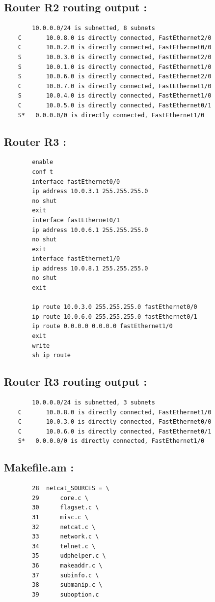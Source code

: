 \documentclass[a4paper,11pt]{article}
\begin{document}
	 	\subsection{Router R2 routing output :}
	 	\label{subsec:routerconfout2}
	 	\begin{lstlisting}
	    10.0.0.0/24 is subnetted, 8 subnets
	C       10.0.8.0 is directly connected, FastEthernet2/0
	C       10.0.2.0 is directly connected, FastEthernet0/0
	S       10.0.3.0 is directly connected, FastEthernet2/0
	S       10.0.1.0 is directly connected, FastEthernet1/0
	S       10.0.6.0 is directly connected, FastEthernet2/0
	C       10.0.7.0 is directly connected, FastEthernet1/0
	S       10.0.4.0 is directly connected, FastEthernet1/0
	C       10.0.5.0 is directly connected, FastEthernet0/1
	S*   0.0.0.0/0 is directly connected, FastEthernet1/0
	 	\end{lstlisting}

	 	\subsection{Router R3 :}
	 	\label{subsec:routerconf3}
	 	\begin{lstlisting}
	 	enable
	 	conf t
	 	interface fastEthernet0/0
	 	ip address 10.0.3.1 255.255.255.0
	 	no shut
	 	exit
	 	interface fastEthernet0/1
	 	ip address 10.0.6.1 255.255.255.0
	 	no shut
	 	exit
	 	interface fastEthernet1/0
	 	ip address 10.0.8.1 255.255.255.0
	 	no shut
	 	exit

	 	ip route 10.0.3.0 255.255.255.0 fastEthernet0/0
	 	ip route 10.0.6.0 255.255.255.0 fastEthernet0/1
	 	ip route 0.0.0.0 0.0.0.0 fastEthernet1/0
	 	exit
	 	write
	 	sh ip route
	 	\end{lstlisting}

	 	\subsection{Router R3 routing output :}
	 	\label{subsec:routerconfout3}
	 	\begin{lstlisting}
	    10.0.0.0/24 is subnetted, 3 subnets
	C       10.0.8.0 is directly connected, FastEthernet1/0
	C       10.0.3.0 is directly connected, FastEthernet0/0
	C       10.0.6.0 is directly connected, FastEthernet0/1
	S*   0.0.0.0/0 is directly connected, FastEthernet1/0
	 	\end{lstlisting}

	 	\subsection{Makefile.am :}
	 	\label{subsec:Makefile.am}
	 	\begin{lstlisting}
	 	28 	netcat_SOURCES = \
	 	29		core.c \
	 	30		flagset.c \
	 	31		misc.c \
	 	32		netcat.c \
	 	33		network.c \
	 	34		telnet.c \
	 	35		udphelper.c \
	 	36		makeaddr.c \
	 	37		subinfo.c \
	 	38		submanip.c \
	 	39		suboption.c
	 	\end{lstlisting}
\end{document}
